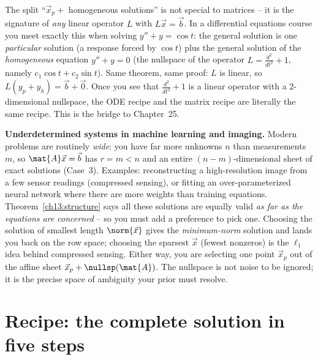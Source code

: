 \begin{connectionbox}
The split ``$\vec{x}_p+$ homogeneous solutions'' is not special to matrices -- it is the
signature of \emph{any} linear operator $L$ with $L\vec{x}=\vec{b}$. In a differential
equations course you meet exactly this when solving $y''+y=\cos t$: the general solution is
one \emph{particular} solution (a response forced by $\cos t$) plus the general solution of
the \emph{homogeneous} equation $y''+y=0$ (the nullspace of the operator
$L=\tfrac{d^2}{dt^2}+1$, namely $c_1\cos t+c_2\sin t$). Same theorem, same proof: $L$ is
linear, so $L(y_p+y_h)=\vec b+\vec 0$. Once you see that $\tfrac{d^2}{dt^2}+1$ is a linear
operator with a $2$-dimensional nullspace, the ODE recipe and the matrix recipe are
literally the same recipe. This is the bridge to Chapter~25.
\end{connectionbox}

\begin{applicationbox}
\textbf{Underdetermined systems in machine learning and imaging.} Modern problems are
routinely \emph{wide}: you have far more unknowns $n$ than measurements $m$, so
$\mat{A}\vec{x}=\vec{b}$ has $r=m<n$ and an entire $(n-m)$-dimensional sheet of exact
solutions (Case~3). Examples: reconstructing a high-resolution image from a few sensor
readings (compressed sensing), or fitting an over-parameterized neural network where there
are more weights than training equations. Theorem~\ref{ch13:structure} says all these
solutions are equally valid \emph{as far as the equations are concerned} -- so you must add
a preference to pick one. Choosing the solution of smallest length $\norm{\vec{x}}$ gives
the \emph{minimum-norm} solution and lands you back on the row space; choosing the sparsest
$\vec{x}$ (fewest nonzeros) is the $\ell_1$ idea behind compressed sensing. Either way, you
are selecting one point $\vec{x}_p$ out of the affine sheet $\vec{x}_p+\nullsp(\mat{A})$.
The nullspace is not noise to be ignored; it is the precise space of ambiguity your prior
must resolve.
\end{applicationbox}

\section{Recipe: the complete solution in five steps}

